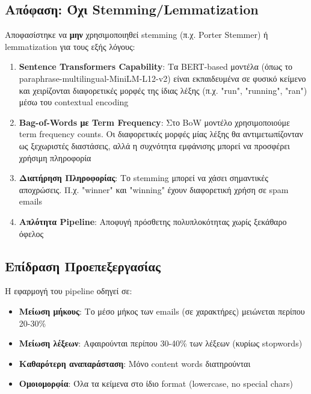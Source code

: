 \documentclass[12pt,a4paper,twoside]{book}
\begin{document}
\subsection{Απόφαση: Όχι Stemming/Lemmatization}

Αποφασίστηκε να \textbf{μην} χρησιμοποιηθεί stemming (π.χ. Porter Stemmer) ή lemmatization για τους εξής λόγους:

\begin{enumerate}
    \item \textbf{Sentence Transformers Capability}: Τα BERT-based μοντέλα (όπως το paraphrase-multilingual-MiniLM-L12-v2) είναι εκπαιδευμένα σε φυσικό κείμενο και χειρίζονται διαφορετικές μορφές της ίδιας λέξης (π.χ. "run", "running", "ran") μέσω του contextual encoding

    \item \textbf{Bag-of-Words με Term Frequency}: Στο BoW μοντέλο χρησιμοποιούμε term frequency counts. Οι διαφορετικές μορφές μίας λέξης θα αντιμετωπίζονταν ως ξεχωριστές διαστάσεις, αλλά η συχνότητα εμφάνισης μπορεί να προσφέρει χρήσιμη πληροφορία

    \item \textbf{Διατήρηση Πληροφορίας}: Το stemming μπορεί να χάσει σημαντικές αποχρώσεις. Π.χ. "winner" και "winning" έχουν διαφορετική χρήση σε spam emails

    \item \textbf{Απλότητα Pipeline}: Αποφυγή πρόσθετης πολυπλοκότητας χωρίς ξεκάθαρο όφελος
\end{enumerate}

\subsection{Επίδραση Προεπεξεργασίας}

Η εφαρμογή του pipeline οδηγεί σε:

\begin{itemize}
    \item \textbf{Μείωση μήκους}: Το μέσο μήκος των emails (σε χαρακτήρες) μειώνεται περίπου 20-30\%
    \item \textbf{Μείωση λέξεων}: Αφαιρούνται περίπου 30-40\% των λέξεων (κυρίως stopwords)
    \item \textbf{Καθαρότερη αναπαράσταση}: Μόνο content words διατηρούνται
    \item \textbf{Ομοιομορφία}: Όλα τα κείμενα στο ίδιο format (lowercase, no special chars)
\end{itemize}
\end{document}
